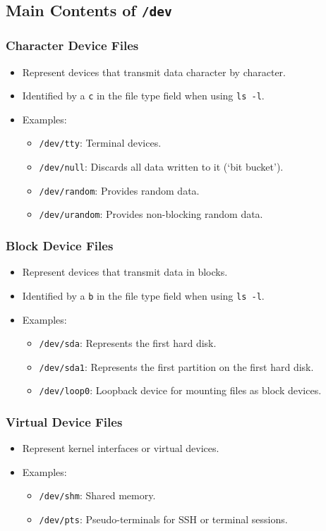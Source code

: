 \subsection*{Main Contents of \texttt{/dev}}

\subsubsection*{Character Device Files}
\begin{itemize}
    \item Represent devices that transmit data character by character.
    \item Identified by a \texttt{c} in the file type field when using \texttt{ls -l}.
    \item Examples:
    \begin{itemize}
        \item \texttt{/dev/tty}: Terminal devices.
        \item \texttt{/dev/null}: Discards all data written to it (`bit bucket').
        \item \texttt{/dev/random}: Provides random data.
        \item \texttt{/dev/urandom}: Provides non-blocking random data.
    \end{itemize}
\end{itemize}

\subsubsection*{Block Device Files}
\begin{itemize}
    \item Represent devices that transmit data in blocks.
    \item Identified by a \texttt{b} in the file type field when using \texttt{ls -l}.
    \item Examples:
    \begin{itemize}
        \item \texttt{/dev/sda}: Represents the first hard disk.
        \item \texttt{/dev/sda1}: Represents the first partition on the first hard disk.
        \item \texttt{/dev/loop0}: Loopback device for mounting files as block devices.
    \end{itemize}
\end{itemize}

\subsubsection*{Virtual Device Files}
\begin{itemize}
    \item Represent kernel interfaces or virtual devices.
    \item Examples:
    \begin{itemize}
        \item \texttt{/dev/shm}: Shared memory.
        \item \texttt{/dev/pts}: Pseudo-terminals for SSH or terminal sessions.
    \end{itemize}
\end{itemize}

